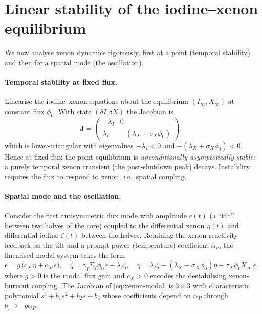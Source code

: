 \section{Linear stability of the iodine--xenon equilibrium}
\label{sec:xenon-stability}

We now analyse xenon dynamics rigorously, first at a point (temporal stability)
and then for a spatial mode (the oscillation).

\paragraph{Temporal stability at fixed flux.}
Linearise the iodine--xenon equations about the equilibrium $(I_\infty,X_\infty)$
at constant flux $\phi_0$. With state $(\delta I,\delta X)$ the Jacobian is
\begin{equation}
\mathbf J=
\begin{pmatrix}
-\lambda_I & 0\\[2pt]
\lambda_I & -(\lambda_X+\sigma_X\phi_0)
\end{pmatrix},
\end{equation}
which is lower-triangular with eigenvalues $-\lambda_I<0$ and
$-(\lambda_X+\sigma_X\phi_0)<0$. Hence at fixed flux the point equilibrium is
\emph{unconditionally asymptotically stable}: a purely temporal xenon transient
(the post-shutdown peak) decays. Instability requires the flux to respond to
xenon, i.e.\ spatial coupling.

\paragraph{Spatial mode and the oscillation.}
Consider the first antisymmetric flux mode with amplitude $\epsilon(t)$ (a
``tilt'' between two halves of the core) coupled to the differential xenon
$\eta(t)$ and differential iodine $\zeta(t)$ between the halves. Retaining the
xenon reactivity feedback on the tilt and a prompt power (temperature) coefficient
$\alpha_P$, the linearised modal system takes the form
\begin{equation}
\dot\epsilon = g\,\big(c_X\,\eta + \alpha_P\,\epsilon\big),\quad
\dot\zeta = \gamma_I\Sigma_f\phi_0\,\epsilon-\lambda_I\zeta,\quad
\dot\eta = \lambda_I\zeta-(\lambda_X+\sigma_X\phi_0)\eta-\sigma_X\phi_0 X_\infty\,\epsilon,
\label{eq:xenon-modal}
\end{equation}
where $g>0$ is the modal flux gain and $c_X>0$ encodes the destabilising
xenon-burnout coupling. The Jacobian of \eqref{eq:xenon-modal} is $3\times3$ with
characteristic polynomial $s^3+b_1 s^2+b_2 s+b_3$ whose coefficients depend on
$\alpha_P$ through $b_1\ni -g\alpha_P$.

